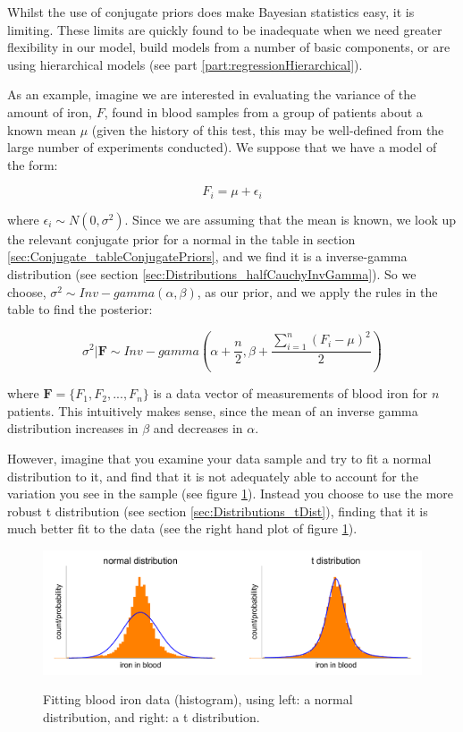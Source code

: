 \documentclass[11pt,fullpage]{book}
\begin{document}
Whilst the use of conjugate priors does make Bayesian statistics easy, it is limiting. These limits are quickly found to be inadequate when we need greater flexibility in our model, build models from a number of basic components, or are using hierarchical models (see part \ref{part:regressionHierarchical}). 

As an example, imagine we are interested in evaluating the variance of the amount of iron, $F$, found in blood samples from a group of patients about a known mean $\mu$ (given the history of this test, this may be well-defined from the large number of experiments conducted). We suppose that we have a model of the form:

\begin{equation}
F_i = \mu + \epsilon_i
\end{equation}

where $\epsilon_i\sim N(0,\sigma^2)$. Since we are assuming that the mean is known, we look up the relevant conjugate prior for a normal in the table in section \ref{sec:Conjugate_tableConjugatePriors}, and we find it is a inverse-gamma distribution (see section \ref{sec:Distributions_halfCauchyInvGamma}). So we choose, $\sigma^2 \sim Inv-gamma(\alpha,\beta)$, as our prior, and we apply the rules in the table to find the posterior:

\begin{equation}
\sigma^2|\boldsymbol{F} \sim Inv-gamma\left(\alpha+ \frac{n}{2}, \beta + \frac{\sum\limits_{i=1}^{n}(F_i-\mu)^2}{2}\right)
\end{equation}

where $\boldsymbol{F}=\{F_1,F_2,...,F_n\}$ is a data vector of measurements of blood iron for $n$ patients. This intuitively makes sense, since the mean of an inverse gamma distribution increases in $\beta$ and decreases in $\alpha$. 

However, imagine that you examine your data sample and try to fit a normal distribution to it, and find that it is not adequately able to account for the variation you see in the sample (see figure \ref{fig:Conjugate_lessonsNormT}). Instead you choose to use the more robust t distribution (see section \ref{sec:Distributions_tDist}), finding that it is much better fit to the data (see the right hand plot of figure \ref{fig:Conjugate_lessonsNormT}). 

\begin{figure}
\centering
\scalebox{0.3} 
{\includegraphics{Conjugate_lessonsNormT.pdf}}
\caption{Fitting blood iron data (histogram), using left: a normal distribution, and right: a t distribution.}\label{fig:Conjugate_lessonsNormT}
\end{figure}
\end{document}

